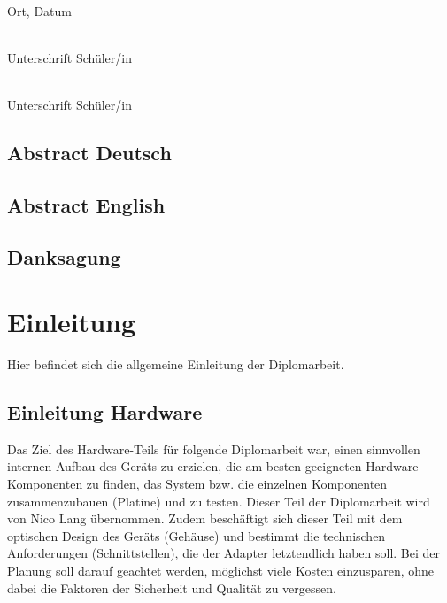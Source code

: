 \documentclass[]{article}
\begin{document}
\noindent
\begin{minipage}[c]{5cm}
	\centering \dotfill \\
	Ort, Datum
\end{minipage}
\hfill
    \begin{minipage}[c]{5cm}
        \centering \dotfill \\
        Unterschrift Schüler/in
    \end{minipage}
    
\vspace{10mm}

\noindent
\begin{flushright}
    \begin{minipage}[c]{5cm}
        \centering \dotfill \\
        Unterschrift Schüler/in
    \end{minipage}
\end{flushright}

\pagebreak

\subsection{Abstract Deutsch}
\subsection{Abstract English}
\subsection{Danksagung}

\tableofcontents

\section{Einleitung}

Hier befindet sich die allgemeine Einleitung der Diplomarbeit.

\subsection{Einleitung Hardware}
Das Ziel des Hardware-Teils für folgende Diplomarbeit war, einen sinnvollen internen Aufbau des Geräts zu erzielen, die am besten geeigneten Hardware-Komponenten zu finden, das System bzw. die einzelnen Komponenten zusammenzubauen (Platine) und zu testen. Dieser Teil der Diplomarbeit wird von Nico Lang übernommen.
Zudem beschäftigt sich dieser Teil mit dem optischen Design des Geräts (Gehäuse) und bestimmt die technischen Anforderungen (Schnittstellen), die der Adapter letztendlich haben soll. 
Bei der Planung soll darauf geachtet werden, möglichst viele Kosten einzusparen, ohne dabei die Faktoren der Sicherheit und Qualität zu vergessen.
\end{document}
